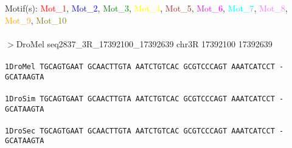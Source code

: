 \documentclass[11pt,twoside,reqno,a4paper]{article}
\begin{document}
\noindent
\newlength{\charwidth}Motif(s): \textcolor{red}{Mot\_1}, \textcolor{blue}{Mot\_2}, \textcolor{green}{Mot\_3}, \textcolor{yellow}{Mot\_4}, \textcolor{brown}{Mot\_5}, \textcolor{magenta}{Mot\_6}, \textcolor{cyan}{Mot\_7}, \textcolor{violet}{Mot\_8}, \textcolor{orange}{Mot\_9}, \textcolor{olive}{Mot\_10}\\
\\
$>$DroMel	seq2837\_3R\_17392100\_17392639	chr3R	17392100	17392639 \\
 \\
\texttt{1\hspace*{3\charwidth}DroMel	TGCAGTGAAT	GCAACTTGTA	AATCTGTCAC	GCGTCCCAGT	AAATCATCCT	-GCATAAGTA	\\
\hspace*{4\charwidth}\hspace*{7\charwidth}\hspace*{1\charwidth}\hspace*{1\charwidth}\hspace*{1\charwidth}\hspace*{1\charwidth}\hspace*{1\charwidth}\hspace*{1\charwidth}\\
1\hspace*{3\charwidth}DroSim	TGCAGTGAAT	GCAACTTGTA	AATCTGTCAC	GCGTCCCAGT	AAATCATCCT	-GCATAAGTA	\\
\hspace*{4\charwidth}\hspace*{7\charwidth}\hspace*{1\charwidth}\hspace*{1\charwidth}\hspace*{1\charwidth}\hspace*{1\charwidth}\hspace*{1\charwidth}\hspace*{1\charwidth}\\
1\hspace*{3\charwidth}DroSec	TGCAGTGAAT	GCAACTTGTA	AATCTGTCAC	GCGTCCCAGT	AAATCATCCT	-GCATAAGTA	\\
\hspace*{4\charwidth}\hspace*{7\charwidth}\hspace*{1\charwidth}\hspace*{1\charwidth}\hspace*{1\charwidth}\hspace*{1\charwidth}\hspace*{1\charwidth}\hspace*{1\charwidth}\\
}
\end{document}
